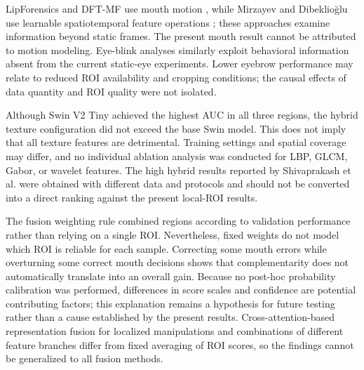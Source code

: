 \documentclass[a4paper]{elektr}
\begin{document}
LipForensics and DFT-MF use mouth motion \cite{haliassos,elhassan}, while Mirzayev and Dibeklioğlu use learnable spatiotemporal feature operations \cite{mirzayev}; these approaches examine information beyond static frames. The present mouth result cannot be attributed to motion modeling. Eye-blink analyses \cite{li,jung} similarly exploit behavioral information absent from the current static-eye experiments. Lower eyebrow performance may relate to reduced ROI availability and cropping conditions; the causal effects of data quantity and ROI quality were not isolated.

Although Swin V2 Tiny achieved the highest AUC in all three regions, the hybrid texture configuration did not exceed the base Swin model. This does not imply that all texture features are detrimental. Training settings and spatial coverage may differ, and no individual ablation analysis was conducted for LBP, GLCM, Gabor, or wavelet features. The high hybrid results reported by Shivaprakash et al. \cite{shivaprakash} were obtained with different data and protocols and should not be converted into a direct ranking against the present local-ROI results.

The fusion weighting rule combined regions according to validation performance rather than relying on a single ROI. Nevertheless, fixed weights do not model which ROI is reliable for each sample. Correcting some mouth errors while overturning some correct mouth decisions shows that complementarity does not automatically translate into an overall gain. Because no post-hoc probability calibration was performed, differences in score scales and confidence are potential contributing factors; this explanation remains a hypothesis for future testing rather than a cause established by the present results. Cross-attention-based representation fusion for localized manipulations \cite{anand} and combinations of different feature branches \cite{lei} differ from fixed averaging of ROI scores, so the findings cannot be generalized to all fusion methods.
\end{document}
